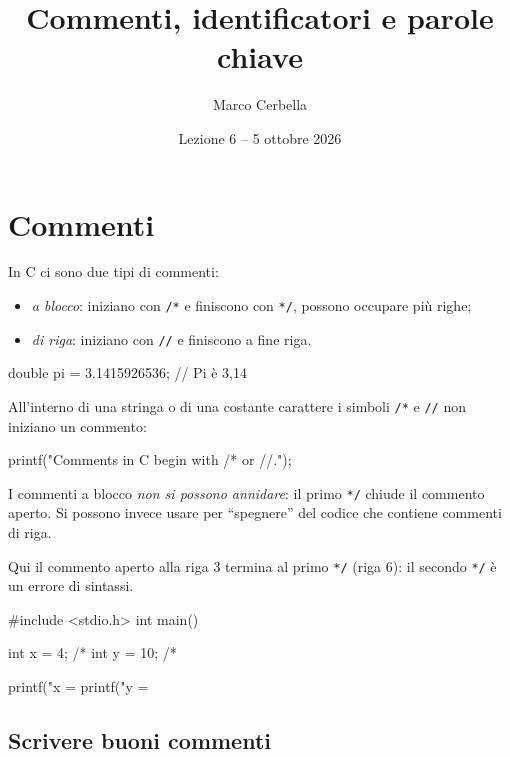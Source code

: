 \documentclass[11pt,a4paper]{article}
\title{Commenti, identificatori e parole chiave}
\author{Marco Cerbella}
\date{Lezione 6 -- 5 ottobre 2026}
\begin{document}
\maketitle

\section{Commenti}

In C ci sono due tipi di commenti:
\begin{itemize}
    \item \emph{a blocco}: iniziano con \lstinline|/*| e finiscono con \lstinline|*/|, possono
          occupare più righe;
    \item \emph{di riga}: iniziano con \lstinline|//| e finiscono a fine riga.
\end{itemize}

\begin{codice}
double pi = 3.1415926536;   // Pi è 3,14
\end{codice}

All'interno di una stringa o di una costante carattere i simboli \lstinline|/*| e
\lstinline|//| non iniziano un commento:
\begin{codice}
printf("Comments in C begin with /* or //.\n");
\end{codice}

\begin{osservazione}
I commenti a blocco \emph{non si possono annidare}: il primo \lstinline|*/|
chiude il commento aperto. Si possono invece usare per ``spegnere'' del codice
che contiene commenti di riga.
\end{osservazione}

\begin{esempio}
Qui il commento aperto alla riga 3 termina al primo \lstinline|*/| (riga 6): il
secondo \lstinline|*/| è un errore di sintassi.
\begin{codice}
#include <stdio.h>
int main() {
    int x = 4; /*
    int y = 10; /*

    printf("x = %
    printf("y = %
}
\end{codice}
\end{esempio}

\subsection{Scrivere buoni commenti}
\end{document}
